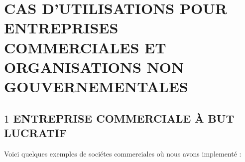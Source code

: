 \chapter{CAS D'UTILISATIONS POUR ENTREPRISES COMMERCIALES ET ORGANISATIONS NON GOUVERNEMENTALES}

\vspace{-2em}


\vspace{1em}

\section{$1$ ENTREPRISE COMMERCIALE \`A BUT LUCRATIF}

Voici quelques exemples de soci\'etes commerciales
o\`u nous avons implement\'e \yerothpgiblack:


